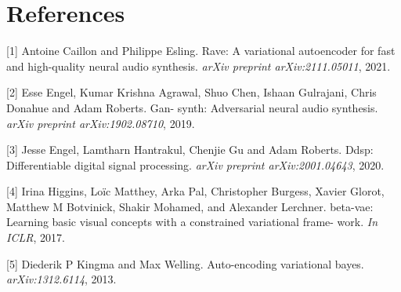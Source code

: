\documentclass{article}
\begin{document}
\section*{References}



[1] Antoine Caillon and Philippe Esling.  Rave: A variational autoencoder for fast and high-quality neural audio synthesis. \textit{arXiv preprint arXiv:2111.05011}, 2021.


[2] Esse Engel, Kumar Krishna Agrawal, Shuo Chen, Ishaan Gulrajani, Chris Donahue and Adam Roberts. Gan- synth: Adversarial neural audio synthesis. \textit{arXiv preprint arXiv:1902.08710}, 2019.


[3] Jesse Engel, Lamtharn Hantrakul, Chenjie Gu and Adam Roberts. Ddsp: Differentiable digital signal processing. \textit{arXiv preprint arXiv:2001.04643}, 2020.

[4] Irina Higgins, Loïc Matthey, Arka Pal, Christopher Burgess, Xavier Glorot, Matthew M Botvinick, Shakir Mohamed, and Alexander Lerchner. beta-vae: Learning basic visual concepts with a constrained variational frame- work. \textit{In ICLR}, 2017.


[5] Diederik P Kingma and Max Welling. Auto-encoding variational bayes. \textit{arXiv:1312.6114}, 2013. 


\end{document}
